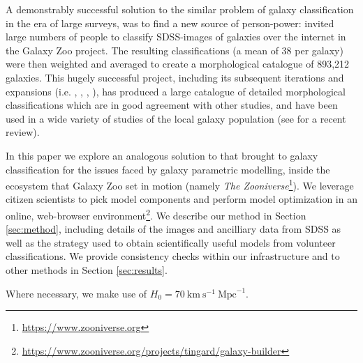 \documentclass[../main.tex]{subfiles}
\begin{document}
A demonstrably successful solution to the similar problem of galaxy classification in the era of large surveys, was to find a new source of person-power: \cite{Lintott2008:0804.4483v1} invited large numbers of people to classify SDSS-images of galaxies over the internet in the Galaxy Zoo project. The resulting classifications (a mean of 38 per galaxy) were then weighted and averaged to create a morphological catalogue of 893,212 galaxies. This hugely successful project, including its subsequent iterations and expansions (i.e. \citealt{Willett2013:1308.3496v2}, \citealt{Hart2016:1607.01019v1}, \citealt{2017MNRAS.464.4176W}, \citealt{2017MNRAS.464.4420S}), has produced a large catalogue of detailed morphological classifications which are in good agreement with other studies, and have been used in a wide variety of studies of the local galaxy population (see \citealt{2019arXiv191008177M} for a recent review).

In this paper we explore an analogous solution to that \citet{Lintott2008:0804.4483v1} brought to galaxy classification for the issues faced by galaxy parametric modelling, inside the ecosystem that Galaxy Zoo set in motion (namely {\it The Zooniverse}\footnote{\url{https://www.zooniverse.org}}). We leverage citizen scientists to pick model components and perform model optimization in an online, web-browser environment\footnote{\url{https://www.zooniverse.org/projects/tingard/galaxy-builder}}. We describe our method in Section \ref{sec:method}, including details of the images and ancilliary data from SDSS as well as the strategy used to obtain scientifically useful models from volunteer classifications. We provide consistency checks within our infrastructure and to other methods in Section \ref{sec:results}.

Where necessary, we make use of $H_0 = 70\ \text{km}\ \text{s}^{-1}\ \text{Mpc}^{-1}$.
\end{document}
